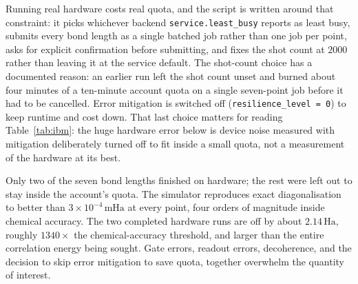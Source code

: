 \documentclass[sigconf,screen,nonacm]{acmart}
\newcommand{\mHa}{\,\text{mHa}}
\newcommand{\Ha}{\,\text{Ha}}
\begin{document}
Running real hardware costs real quota, and the script is written around
that constraint: it picks whichever backend \texttt{service.least\_busy}
reports as least busy, submits every bond length as a single batched job
rather than one job per point, asks for explicit confirmation before
submitting, and fixes the shot count at $2000$ rather than leaving it at the
service default. The shot-count choice has a documented reason: an earlier
run left the shot count unset and burned about four minutes of a ten-minute
account quota on a single seven-point job before it had to be cancelled.
Error mitigation is switched off (\texttt{resilience\_level = 0}) to keep
runtime and cost down. That last choice matters for reading
Table~\ref{tab:ibm}: the huge hardware error below is device noise measured
with mitigation deliberately turned off to fit inside a small quota, not a
measurement of the hardware at its best.

\begin{table}[!htbp]
\caption{ on an exact statevector simulator versus IBM Quantum
hardware, from \texttt{VQE demo on IBM Quantum Computer/}. Errors are
$|E_{\text{VQE}} - E_{\text{exact}}|$ in mHa. The simulator is accurate to
sub-micro-Hartree; the hardware, run with error mitigation off to control
cost, is off by more than two Hartree.}
\label{tab:ibm}
\centering\footnotesize
{}
\end{table}

Only two of the seven bond lengths finished on hardware; the rest were left
out to stay inside the account's quota. The simulator reproduces exact
diagonalisation to better than $3\times10^{-4}\mHa$ at every point, four
orders of magnitude inside chemical accuracy. The two completed hardware runs
are off by about $2.14\Ha$, roughly $1340\times$ the chemical-accuracy
threshold, and larger than the entire correlation energy being sought. Gate
errors, readout errors, decoherence, and the decision to skip error
mitigation to save quota, together overwhelm the quantity of interest.
\end{document}

